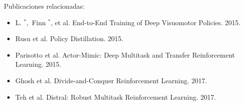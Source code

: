 Publicaciones relacionadas:
\begin{itemize}
    \item L. \( ^{*}, \) Finn \( ^{*} \), et al. End-to-End Training of Deep Visuomotor Policies. 2015.
    \item Rusu et al. Policy Distillation. 2015.
    \item Parisotto et al. Actor-Mimic: Deep Multitask and Transfer Reinforcement Learning. 2015. 
    \item Ghosh et al. Divide-and-Conquer Reinforcement Learning. 2017. 
    \item Teh et al. Distral: Robust Multitask Reinforcement Learning. 2017.
\end{itemize}
